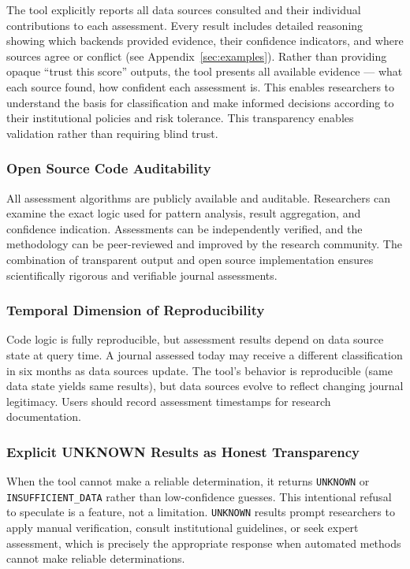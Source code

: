 \documentclass[fleqn,10pt]{SelfArx}
\begin{document}
The tool explicitly reports all data sources consulted and their
individual contributions to each assessment. Every result includes
detailed reasoning showing which backends provided evidence, their
confidence indicators, and where sources agree or conflict (see
Appendix~\ref{sec:examples}). Rather than providing opaque ``trust this
score'' outputs, the tool presents all available evidence --- what each
source found, how confident each assessment is. This enables researchers
to understand the basis for classification and make informed decisions
according to their institutional policies and risk tolerance. This
transparency enables validation rather than requiring blind trust.

\subsubsection{Open Source Code Auditability}

All assessment algorithms are publicly available and auditable.
Researchers can examine the exact logic used for pattern analysis,
result aggregation, and confidence indication. Assessments can be
independently verified, and the methodology can be peer-reviewed and
improved by the research community. The combination of transparent
output and open source implementation ensures scientifically rigorous
and verifiable journal assessments.

\subsubsection{Temporal Dimension of Reproducibility}

Code logic is fully reproducible, but assessment results depend on data
source state at query time. A journal assessed today may receive a
different classification in six months as data sources update. The
tool's behavior is reproducible (same data state yields same results),
but data sources evolve to reflect changing journal legitimacy. Users
should record assessment timestamps for research documentation.

\subsubsection{Explicit UNKNOWN Results as Honest Transparency}

When the tool cannot make a reliable determination, it returns
\texttt{UNKNOWN} or \texttt{INSUFFICIENT\_DATA} rather than
low-confidence guesses. This intentional refusal to speculate is a
feature, not a limitation. \texttt{UNKNOWN} results prompt researchers
to apply manual verification, consult institutional guidelines, or
seek expert assessment, which is precisely the appropriate response
when automated methods cannot make reliable determinations.
\end{document}
